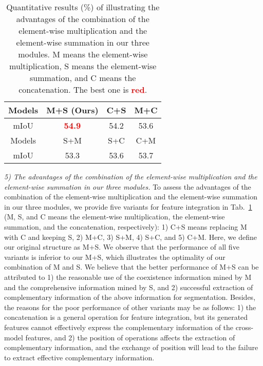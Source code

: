 \documentclass[journal]{IEEEtran}
\begin{document}
\begin{table}[!t]
\centering
\small
\caption{Quantitative results (\%) of illustrating the advantages of the combination of the element-wise multiplication and the element-wise summation in our three modules.
M means the element-wise multiplication, S means the element-wise summation, and C means the concatenation.
  The best one is \textcolor{red}{\textbf{red}}.
  }
\label{Ablation_MulSum}
\renewcommand{\arraystretch}{1.4}
\renewcommand{\tabcolsep}{3.3mm}
\begin{tabular}{c||ccc}
\bottomrule

Models & \textbf{M+S (Ours)} & C+S & M+C  \\

\hline

mIoU  & \textcolor{red}{\textbf{54.9}} & 54.2  & 53.6  \\

\hline
\hline

Models & S+M & S+C  & C+M \\

\hline

mIoU  & 53.3 & 53.6 & 53.7  \\

\toprule

\end{tabular}
\end{table}


\textit{5) The advantages of the combination of the element-wise multiplication and the element-wise summation in our three modules.}
To assess the advantages of the combination of the element-wise multiplication and the element-wise summation in our three modules, we provide five variants for feature integration in Tab.~\ref{Ablation_MulSum} (M, S, and C means the element-wise multiplication, the element-wise summation, and the concatenation, respectively):
1) C+S means replacing M with C and keeping S,
2) M+C,
3) S+M,
4) S+C, and
5) C+M.
Here, we define our original structure as M+S.
We observe that the performance of all five variants is inferior to our M+S, which illustrates the optimality of our combination of M and S.
We believe that the better performance of M+S can be attributed to
1) the reasonable use of the coexistence information mined by M and the comprehensive information mined by S, and
2) successful extraction of complementary information of the above information for segmentation.
Besides, the reasons for the poor performance of other variants may be as follows:
1) the concatenation is a general operation for feature integration, but its generated features cannot effectively express the complementary information of the cross-model features, and
2) the position of operations affects the extraction of complementary information, and the exchange of position will lead to the failure to extract effective complementary information.
\end{document}

